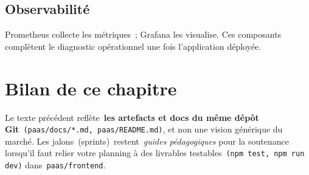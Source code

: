 \subsection{Observabilité}

Prometheus collecte les métriques~; Grafana les visualise. Ces composants complètent le diagnostic opérationnel une fois l'application déployée.

\section{Bilan de ce chapitre}

Le texte précédent reflète~\textbf{les artefacts et docs du même dépôt Git}~\texttt{(paas/docs/*.md, paas/README.md)}, et non une vision générique du marché. Les jalons~(sprints)~restent~\emph{guides pédagogiques} pour la soutenance lorsqu'il faut relier votre planning à des livrables testables~\texttt{(npm test, npm run dev)} dans~\texttt{paas/frontend}.
